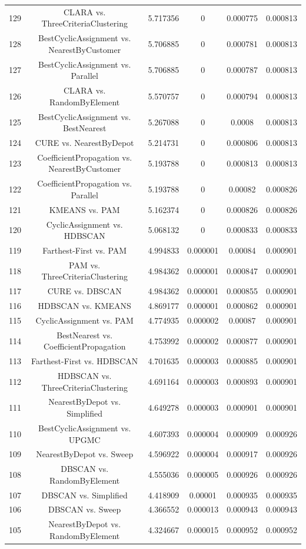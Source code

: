 \documentclass[a4paper,10pt]{article}
\begin{document}
\begin{landscape}
\begin{table}[!htp]
\begin{tabular}{cccccc}
129&CLARA vs. ThreeCriteriaClustering&5.717356&0&0.000775&0.000813\\
128&BestCyclicAssignment vs. NearestByCustomer&5.706885&0&0.000781&0.000813\\
127&BestCyclicAssignment vs. Parallel&5.706885&0&0.000787&0.000813\\
126&CLARA vs. RandomByElement&5.570757&0&0.000794&0.000813\\
125&BestCyclicAssignment vs. BestNearest&5.267088&0&0.0008&0.000813\\
124&CURE vs. NearestByDepot&5.214731&0&0.000806&0.000813\\
123&CoefficientPropagation vs. NearestByCustomer&5.193788&0&0.000813&0.000813\\
122&CoefficientPropagation vs. Parallel&5.193788&0&0.00082&0.000826\\
121&KMEANS vs. PAM&5.162374&0&0.000826&0.000826\\
120&CyclicAssignment vs. HDBSCAN&5.068132&0&0.000833&0.000833\\
119&Farthest-First vs. PAM&4.994833&0.000001&0.00084&0.000901\\
118&PAM vs. ThreeCriteriaClustering&4.984362&0.000001&0.000847&0.000901\\
117&CURE vs. DBSCAN&4.984362&0.000001&0.000855&0.000901\\
116&HDBSCAN vs. KMEANS&4.869177&0.000001&0.000862&0.000901\\
115&CyclicAssignment vs. PAM&4.774935&0.000002&0.00087&0.000901\\
114&BestNearest vs. CoefficientPropagation&4.753992&0.000002&0.000877&0.000901\\
113&Farthest-First vs. HDBSCAN&4.701635&0.000003&0.000885&0.000901\\
112&HDBSCAN vs. ThreeCriteriaClustering&4.691164&0.000003&0.000893&0.000901\\
111&NearestByDepot vs. Simplified&4.649278&0.000003&0.000901&0.000901\\
110&BestCyclicAssignment vs. UPGMC&4.607393&0.000004&0.000909&0.000926\\
109&NearestByDepot vs. Sweep&4.596922&0.000004&0.000917&0.000926\\
108&DBSCAN vs. RandomByElement&4.555036&0.000005&0.000926&0.000926\\
107&DBSCAN vs. Simplified&4.418909&0.00001&0.000935&0.000935\\
106&DBSCAN vs. Sweep&4.366552&0.000013&0.000943&0.000943\\
105&NearestByDepot vs. RandomByElement&4.324667&0.000015&0.000952&0.000952\\

\end{tabular}
\end{table}
\end{landscape}
\end{document}
